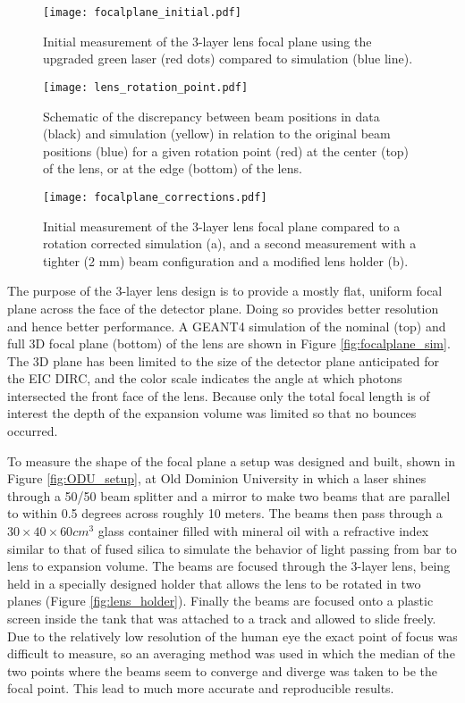 \begin{figure}[!htb]
	\centering
	\texttt{[image: focalplane\_initial.pdf]}
	\caption{Initial measurement of the 3-layer lens focal plane using the upgraded green laser (red dots) compared to simulation (blue line).}
	\label{fig:focalplane_initial}
\end{figure}

\begin{figure}[!htb]
	\centering
	\texttt{[image: lens\_rotation\_point.pdf]}
	\caption{Schematic of the discrepancy between beam positions in data (black) and simulation (yellow) in relation to the original beam positions (blue) for a given rotation point (red) at the center (top) of the lens, or at the edge (bottom) of the lens. }
	\label{fig:lens_rotation_point}
\end{figure}

\begin{figure}[!htb]
	\centering
	\texttt{[image: focalplane\_corrections.pdf]}
	\caption{Initial measurement of the 3-layer lens focal plane compared to a rotation corrected simulation (a), and a second measurement with a tighter (2 mm) beam configuration and a modified lens holder (b).}
	\label{fig:focalplane_corrections}
\end{figure}

The purpose of the 3-layer lens design is to provide a mostly flat, uniform focal plane across the face of the detector plane. Doing so provides better resolution and hence better performance. A GEANT4 simulation of the nominal (top) and full 3D focal plane (bottom) of the lens are shown in Figure \ref{fig:focalplane_sim}. The 3D plane has been limited to the size of the detector plane anticipated for the EIC DIRC, and the color scale indicates the angle at which photons intersected the front face of the lens. Because only the total focal length is of interest the depth of the expansion volume was limited so that no bounces occurred.

To measure the shape of the focal plane a setup was designed and built, shown in Figure \ref{fig:ODU_setup}, at Old Dominion University in which a laser shines through a 50/50 beam splitter and a mirror to make two beams that are parallel to within 0.5 degrees across roughly 10 meters. The beams then pass through a $30\times40\times60\unit{cm}^3$ glass container filled with mineral oil with a refractive index similar to that of fused silica to simulate the behavior of light passing from bar to lens to expansion volume. The beams are focused through the 3-layer lens, being held in a specially designed holder that allows the lens to be rotated in two planes (Figure \ref{fig:lens_holder}). Finally the beams are focused onto a plastic screen inside the tank that was attached to a track and allowed to slide freely. Due to the relatively low resolution of the human eye the exact point of focus was difficult to measure, so an averaging method was used in which the median of the two points where the beams seem to converge and diverge was taken to be the focal point. This lead to much more accurate and reproducible results.

